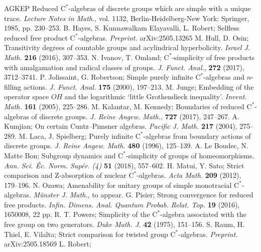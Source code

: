 \documentclass[12pt,nosumlimits,nonamelimits]{amsart}
\theoremstyle{remark}
\theoremstyle{definition}
\begin{document}
\begin{thebibliography}{AGKEP}
Reduced $\mathrm{C}^*$-algebras of discrete groups which are simple with a unique trace. 
\emph{Lecture Notes in Math.}, vol. 1132, Berlin-Heidelberg-New York: Springer, 1985, pp. 230--253. 
%
 B. Hayes, S. Kunnawalkam Elayavalli, L. Robert;
Selfless reduced free product $\mathrm{C}^*$-alge\-bras.
\emph{Preprint.} arXiv:2505.13265
%
 M. Hull, D. Osin; 
Transitivity degrees of countable groups and acylindrical hyperbolicity. 
\emph{Israel J. Math.} \textbf{216} (2016), 307--353. 
%
 N. Ivanov, T. Omland; 
$\mathrm{C}^*$-simplicity of free products with amalgamation 
and radical classes of groups. 
\emph{J. Funct. Anal.}, \textbf{272} (2017), 3712--3741.
%
 P. Jolissaint, G. Robertson;
Simple purely infinite $\mathrm{C}^*$-alge\-bras and $n$-filling actions. 
\emph{J. Funct. Anal.} \textbf{175} (2000), 197--213.
%
 M. Junge;
Embedding of the operator space $OH$ and the logarithmic `little Grothendieck inequality'. \emph{Invent. Math.} \textbf{161} (2005), 225--286. 
%
 M. Kalantar, M. Kennedy; 
Boundaries of reduced $\mathrm{C}^*$-alge\-bras of discrete groups. 
\emph{J. Reine Angew. Math.}, \textbf{727} (2017), 247--267.
%
 A. Kumjian; 
On certain Cuntz--Pimsner algebras. 
\emph{Pacific J. Math.} \textbf{217} (2004), 275--289.
%
 M. Laca, J. Spielberg;
Purely infinite $\mathrm{C}^*$-alge\-bras from boundary actions of discrete groups. 
\emph{J. Reine Angew. Math.} \textbf{480} (1996), 125--139.
%
 A. Le Boudec, N. Matte Bon; 
Subgroup dynamics and $\mathrm{C}^*$-simplicity of groups of homeomorphisms. 
\emph{Ann. Sci. \'Ec. Norm. Sup\'{e}r. (4)} \textbf{51} (2018), 557--602.
%
 H. Matui, Y. Sato; 
Strict comparison and Z-absorption of nuclear $\mathrm{C}^*$-algebras.
\emph{Acta Math.} \textbf{209} (2012), 179--196.
%
 N. Ozawa;
Amenability for unitary groups of simple monotracial $\mathrm{C}^*$-alge\-bras.
\emph{M\"{u}nster J. Math.}, to appear.  
%
 G. Pisier; 
Strong convergence for reduced free products. 
\emph{Infin. Dimens. Anal. Quantum Probab. Relat. Top.} \textbf{19} (2016), 1650008, 22 pp. 
%
 R. T. Powers; 
Simplicity of the $\mathrm{C}^*$-algebra associated with the free group on two generators. 
\emph{Duke Math. J.} \textbf{42} (1975), 151--156. 
%
 S. Raum, H. Thiel, E. Vilalta; 
Strict comparison for twisted group $\mathrm{C}^*$-alge\-bras.
\emph{Preprint.} arXiv:2505.18569
%
 L. Robert; 

\end{thebibliography}
\end{document}
